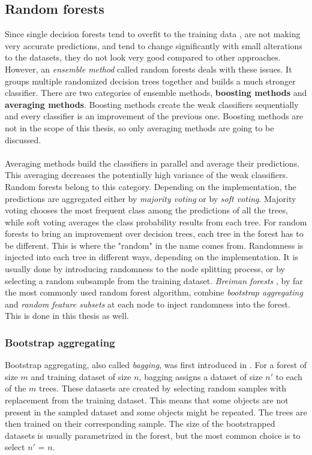 \documentclass[11pt]{article}
\begin{document}
    \subsection{Random forests}
      Since single decision forests tend to overfit to the training data \cite{isl}, are not making very accurate predictions, and tend to change significantly with small alterations to the datasets, they do not look very good compared to other approaches. However, an {\it ensemble method} called random forests deals with these issues. It groups multiple randomized decision trees together and builds a much stronger classifier. There are two categories of ensemble methods, {\bf boosting methods} and {\bf averaging methods}. Boosting methods create the weak classifiers sequentially and every classifier is an improvement of the previous one. \cite{brabec} Boosting methods are not in the scope of this thesis, so only averaging methods are going to be discussed.
      \\~\\
      Averaging methods build the classifiers in parallel and average their predictions. This averaging decreases the potentially high variance of the weak classifiers. Random forests belong to this category. \cite{brabec} Depending on the implementation, the predictions are aggregated either by {\it majority voting} or by {\it soft voting}. Majority voting chooses the most frequent class among the predictions of all the trees, while soft voting averages the class probability results from each tree. \cite{ensemble} For random forests to bring an improvement over decision trees, each tree in the forest has to be different. This is where the "random" in the name comes from. Randomness is injected into each tree in different ways, depending on the implementation. It is usually done by introducing randomness to the node splitting process, or by selecting a random subsample from the training dataset. \cite{brabec} {\it Breiman forests} \cite{breiman}, by far the most commonly used random forest algorithm, combine {\it bootstrap aggregating} and {\it random feature subsets} at each node to inject randomness into the forest. This is done in this thesis as well.
      \subsubsection{Bootstrap aggregating}
        Bootstrap aggregating, also called {\it bagging}, was first introduced in \cite{bagging}. For a forest of size $m$ and training dataset of size $n$, bagging assigns a dataset of size $n'$ to each of the $m$ trees. These datasets are created by selecting random samples with replacement from the training dataset. This means that some objects are not present in the sampled dataset and some objects might be repeated. The trees are then trained on their corresponding sample. The size of the bootstrapped datasets is usually parametrized in the forest, but the most common choice is to select $n'$ = $n$.
\end{document}
